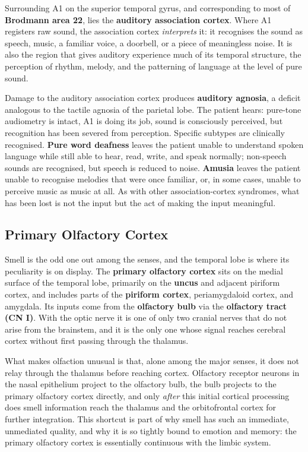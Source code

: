 \documentclass[11pt]{article}
\begin{document}
Surrounding A1 on the superior temporal gyrus, and corresponding to most of \textbf{Brodmann area 22}, lies the \textbf{auditory association cortex}. Where A1 registers raw sound, the association cortex \textit{interprets} it: it recognises the sound as speech, music, a familiar voice, a doorbell, or a piece of meaningless noise. It is also the region that gives auditory experience much of its temporal structure, the perception of rhythm, melody, and the patterning of language at the level of pure sound.

Damage to the auditory association cortex produces \textbf{auditory agnosia}, a deficit analogous to the tactile agnosia of the parietal lobe. The patient hears: pure-tone audiometry is intact, A1 is doing its job, sound is consciously perceived, but recognition has been severed from perception. Specific subtypes are clinically recognised. \textbf{Pure word deafness} leaves the patient unable to understand spoken language while still able to hear, read, write, and speak normally; non-speech sounds are recognised, but speech is reduced to noise. \textbf{Amusia} leaves the patient unable to recognise melodies that were once familiar, or, in some cases, unable to perceive music as music at all. As with other association-cortex syndromes, what has been lost is not the input but the act of making the input meaningful.

\subsection{Primary Olfactory Cortex}

Smell is the odd one out among the senses, and the temporal lobe is where its peculiarity is on display. The \textbf{primary olfactory cortex} sits on the medial surface of the temporal lobe, primarily on the \textbf{uncus} and adjacent piriform cortex, and includes parts of the \textbf{piriform cortex}, periamygdaloid cortex, and amygdala. Its inputs come from the \textbf{olfactory bulb} via the \textbf{olfactory tract (CN I)}. With the optic nerve it is one of only two cranial nerves that do not arise from the brainstem, and it is the only one whose signal reaches cerebral cortex without first passing through the thalamus.

What makes olfaction unusual is that, alone among the major senses, it does not relay through the thalamus before reaching cortex. Olfactory receptor neurons in the nasal epithelium project to the olfactory bulb, the bulb projects to the primary olfactory cortex directly, and only \textit{after} this initial cortical processing does smell information reach the thalamus and the orbitofrontal cortex for further integration. This shortcut is part of why smell has such an immediate, unmediated quality, and why it is so tightly bound to emotion and memory: the primary olfactory cortex is essentially continuous with the limbic system.
\end{document}
